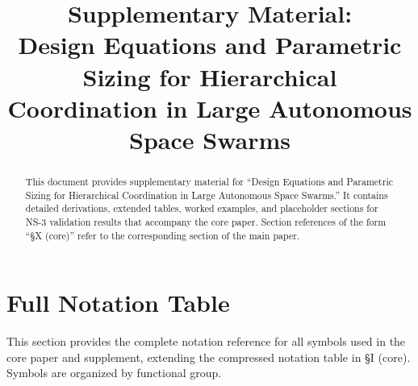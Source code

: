 \documentclass[journal]{IEEEtran}
\begin{document}
\title{Supplementary Material:\\Design Equations and Parametric Sizing for Hierarchical Coordination in Large Autonomous Space Swarms}

\author{
}


\maketitle

\begin{abstract}
This document provides supplementary material for ``Design Equations and Parametric Sizing for Hierarchical Coordination in Large Autonomous Space Swarms.'' It contains detailed derivations, extended tables, worked examples, and placeholder sections for NS-3 validation results that accompany the core paper. Section references of the form ``\S X (core)'' refer to the corresponding section of the main paper.
\end{abstract}

\appendix

\renewcommand{\thetable}{S\arabic{table}}
\renewcommand{\thefigure}{S\arabic{figure}}
\setcounter{table}{0}
\setcounter{figure}{0}

\section{Full Notation Table}
\label{sec:supp-notation}

This section provides the complete notation reference for all symbols used in the core paper and supplement, extending the compressed notation table in \S I (core). Symbols are organized by functional group.
\end{document}
